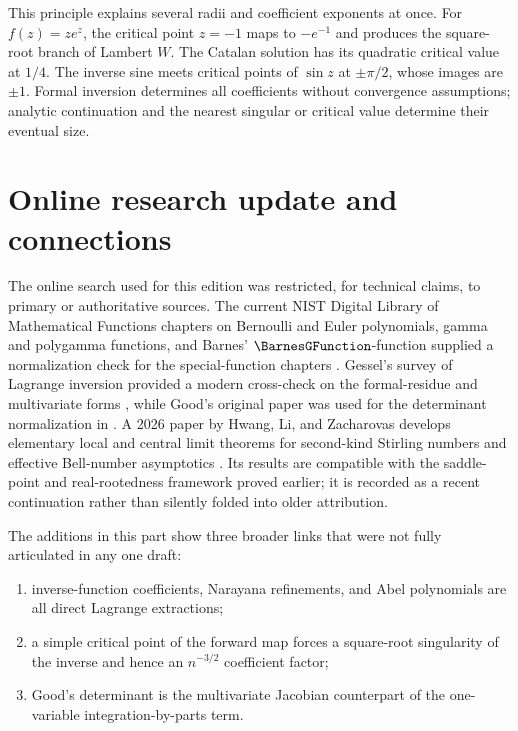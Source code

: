 \documentclass[11pt,a4paper,oneside,openany]{book}
\theoremstyle{definition}
\theoremstyle{remark}
\begin{document}
This principle explains several radii and coefficient exponents at once.
For $f(z)=ze^z$, the critical point $z=-1$ maps to $-e^{-1}$ and produces
the square-root branch of Lambert $W$.  The Catalan solution has its quadratic
critical value at $1/4$.  The inverse sine meets critical points of $\sin z$
at $\pm\pi/2$, whose images are $\pm1$.  Formal inversion determines all
coefficients without convergence assumptions; analytic continuation and the
nearest singular or critical value determine their eventual size.

\chapter{Online research update and connections}
\label{ch:online-update}

The online search used for this edition was restricted, for technical claims,
to primary or authoritative sources.  The current NIST Digital Library of
Mathematical Functions chapters on Bernoulli and Euler polynomials, gamma and
polygamma functions, and Barnes' $\BarnesGFunction$-function supplied a normalization check
for the special-function chapters \cite{NISTDLMF}.  Gessel's survey of Lagrange
inversion provided a modern cross-check on the formal-residue and multivariate
forms \cite{Gessel2016}, while Good's original paper was used for the determinant
normalization in  \cite{Good1960}.  A 2026 paper by Hwang,
Li, and Zacharovas develops elementary local and central limit theorems for
second-kind Stirling numbers and effective Bell-number asymptotics
\cite{HwangLiZacharovas2026}.  Its results are compatible with the saddle-point
and real-rootedness framework proved earlier; it is recorded as a recent
continuation rather than silently folded into older attribution.

The additions in this part show three broader links that were not fully
articulated in any one draft:
\begin{enumerate}
\item inverse-function coefficients, Narayana refinements, and Abel
      polynomials are all direct Lagrange extractions;
\item a simple critical point of the forward map forces a square-root
      singularity of the inverse and hence an $n^{-3/2}$ coefficient factor;
\item Good's determinant is the multivariate Jacobian counterpart of the
      one-variable integration-by-parts term.
\end{enumerate}
\end{document}
